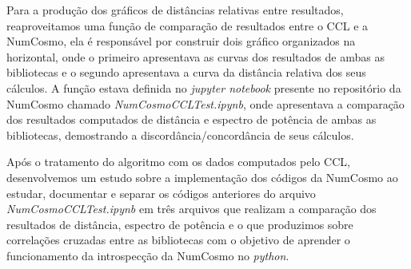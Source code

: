 Para a produção dos gráficos de distâncias relativas entre resultados, reaproveitamos uma função de comparação de resultados entre o CCL e a NumCosmo, ela é responsável por construir dois gráfico organizados na horizontal, onde o primeiro apresentava as curvas dos resultados de ambas as bibliotecas e o segundo apresentava a curva da distância relativa dos seus cálculos. A função estava definida no \textit{jupyter notebook} presente no repositório da NumCosmo chamado \textit{NumCosmoCCLTest.ipynb}, onde apresentava a comparação dos resultados computados de distância e espectro de potência de ambas as bibliotecas, demostrando a discordância/concordância de seus cálculos.

Após o tratamento do algoritmo com os dados computados pelo CCL, desenvolvemos um estudo sobre a implementação dos códigos da NumCosmo ao estudar, documentar e separar os códigos anteriores do arquivo \textit{NumCosmoCCLTest.ipynb} em três arquivos que realizam a comparação dos resultados de distância, espectro de potência e o que produzimos sobre correlações cruzadas entre as bibliotecas com o objetivo de aprender o funcionamento da introspecção da NumCosmo no \textit{python}.










